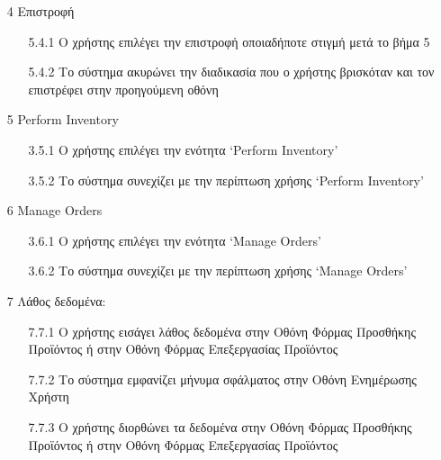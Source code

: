 \documentclass[12pt,a4paper,twoside]{book}
\begin{document}
\begin{enumerate}
  \item[4 ] Επιστροφή
        \begin{enumerate}
          \item[5.4.1 ] Ο χρήστης επιλέγει την επιστροφή οποιαδήποτε στιγμή μετά το βήμα 5 %
          \item[5.4.2 ] Το σύστημα ακυρώνει την διαδικασία που ο χρήστης βρισκόταν και τον επιστρέφει στην προηγούμενη οθόνη %
        \end{enumerate}
  \item[5 ] Perform Inventory
        \begin{enumerate}
          \item[3.5.1 ] Ο χρήστης επιλέγει την ενότητα `Perform Inventory'
          \item[3.5.2 ] Το σύστημα συνεχίζει με την περίπτωση χρήσης `Perform Inventory'
        \end{enumerate}
  \item[6 ] Manage Orders
        \begin{enumerate}
          \item[3.6.1 ] Ο χρήστης επιλέγει την ενότητα `Manage Orders'
          \item[3.6.2 ] Το σύστημα συνεχίζει με την περίπτωση χρήσης `Manage Orders'
        \end{enumerate}
  \item[7 ] Λάθος δεδομένα: %
        \begin{enumerate}
          \item[7.7.1 ] Ο χρήστης εισάγει λάθος δεδομένα στην Οθόνη Φόρμας Προσθήκης Προϊόντος ή στην Οθόνη Φόρμας Επεξεργασίας Προϊόντος %
          \item[7.7.2 ] Το σύστημα εμφανίζει μήνυμα σφάλματος στην Οθόνη Ενημέρωσης Χρήστη %
          \item[7.7.3 ] Ο χρήστης διορθώνει τα δεδομένα στην Οθόνη Φόρμας Προσθήκης Προϊόντος ή στην Οθόνη Φόρμας Επεξεργασίας Προϊόντος %
        \end{enumerate}
\end{enumerate}
\end{document}
